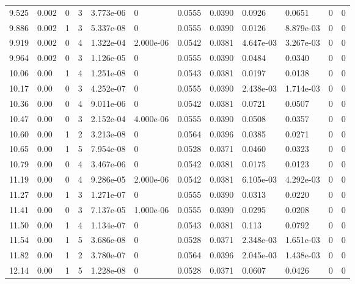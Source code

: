 \documentclass[preview]{standalone}
\begin{document}
{{{\begin{tabular}{L{1.2cm}C{1.2cm} C{0.3cm}C{0.5cm} C{1.4cm}C{1.4cm} C{1.4cm}C{1.4cm} C{1.6cm}C{1.6cm} C{1.6cm}C{1.6cm}}
  9.525  &  0.002  & 0     &  3 &  3.773e-06  & 0  &  0.0555&   0.0390& 0.0926 & 0.0651   &  0 & 0  \\ 
  9.886  &  0.002  & 1     &  3 &  5.337e-08  & 0  &  0.0555&   0.0390& 0.0126 & 8.879e-03   &  0 & 0  \\ 
  9.919  &  0.002  & 0     &  4 &  1.322e-04  & 2.000e-06  &  0.0542&   0.0381& 4.647e-03 & 3.267e-03   &  0 & 0  \\ 
  9.964  &  0.002  & 0     &  3 &  1.126e-05  & 0  &  0.0555&   0.0390& 0.0484 & 0.0340   &  0 & 0  \\ 
  10.06  &  0.00  & 1     &  4 &  1.251e-08  & 0  &  0.0543&   0.0381& 0.0197 & 0.0138   &  0 & 0  \\ 
  10.17  &  0.00  & 0     &  3 &  4.252e-07  & 0  &  0.0555&   0.0390& 2.438e-03 & 1.714e-03   &  0 & 0  \\ 
  10.36  &  0.00  & 0     &  4 &  9.011e-06  & 0  &  0.0542&   0.0381& 0.0721 & 0.0507   &  0 & 0  \\ 
  10.47  &  0.00  & 0     &  3 &  2.152e-04  & 4.000e-06  &  0.0555&   0.0390& 0.0508 & 0.0357   &  0 & 0  \\ 
  10.60  &  0.00  & 1     &  2 &  3.213e-08  & 0  &  0.0564&   0.0396& 0.0385 & 0.0271   &  0 & 0  \\ 
  10.65  &  0.00  & 1     &  5 &  7.954e-08  & 0  &  0.0528&   0.0371& 0.0460 & 0.0323   &  0 & 0  \\ 
  10.79  &  0.00  & 0     &  4 &  3.467e-06  & 0  &  0.0542&   0.0381& 0.0175 & 0.0123   &  0 & 0  \\ 
  11.19  &  0.00  & 0     &  4 &  9.286e-05  & 2.000e-06  &  0.0542&   0.0381& 6.105e-03 & 4.292e-03   &  0 & 0  \\ 
  11.27  &  0.00  & 1     &  3 &  1.271e-07  & 0  &  0.0555&   0.0390& 0.0313 & 0.0220   &  0 & 0  \\ 
  11.41  &  0.00  & 0     &  3 &  7.137e-05  & 1.000e-06  &  0.0555&   0.0390& 0.0295 & 0.0208   &  0 & 0  \\ 
  11.50  &  0.00  & 1     &  4 &  1.134e-07  & 0  &  0.0543&   0.0381& 0.113 & 0.0792   &  0 & 0  \\ 
  11.54  &  0.00  & 1     &  5 &  3.686e-08  & 0  &  0.0528&   0.0371& 2.348e-03 & 1.651e-03   &  0 & 0  \\ 
  11.82  &  0.00  & 1     &  2 &  3.780e-07  & 0  &  0.0564&   0.0396& 2.045e-03 & 1.438e-03   &  0 & 0  \\ 
  12.14  &  0.00  & 1     &  5 &  1.228e-08  & 0  &  0.0528&   0.0371& 0.0607 & 0.0426   &  0 & 0  \\ 

\end{tabular}}}}
\end{document}
